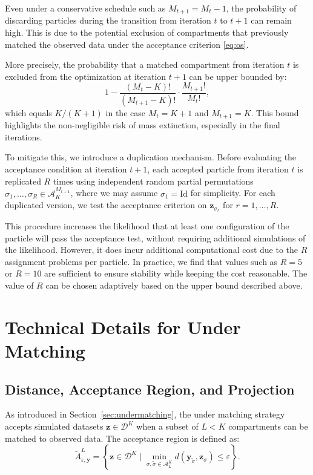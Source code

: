 \documentclass[11pt,a4paper]{article}
\def\dataspace{\mathcal{D}}
\def\obsdata{\mathbf{y}}
\def\simdata{\mathbf{z}}
\theoremstyle{plain}
\theoremstyle{definition}
\theoremstyle{remark}
\begin{document}
Even under a conservative schedule such as \( M_{t+1} = M_t - 1 \), the probability of discarding particles during the transition from iteration \( t \) to \( t+1 \) can remain high. This is due to the potential exclusion of compartments that previously matched the observed data under the acceptance criterion \eqref{eq:os}.

More precisely, the probability that a matched compartment from iteration \( t \) is excluded from the optimization at iteration \( t+1 \) can be upper bounded by:
\[
1 - \frac{(M_t - K)!}{(M_{t+1} - K)!} \cdot \frac{M_{t+1}!}{M_t!},
\]
which equals \( K/(K+1) \) in the case \( M_t = K + 1 \) and \( M_{t+1} = K \). This bound highlights the non-negligible risk of mass extinction, especially in the final iterations.

To mitigate this, we introduce a duplication mechanism. Before evaluating the acceptance condition at iteration \( t+1 \), each accepted particle from iteration \( t \) is replicated \( R \) times using independent random partial permutations \( \sigma_1, \dots, \sigma_R \in \mathcal{A}_K^{M_{t+1}} \), where we may assume \( \sigma_1 = \mathrm{Id} \) for simplicity. For each duplicated version, we test the acceptance criterion on \( \simdata_{\sigma_r} \) for \( r = 1, \dots, R \).

This procedure increases the likelihood that at least one configuration of the particle will pass the acceptance test, without requiring additional simulations of the likelihood. However, it does incur additional computational cost due to the \( R \) assignment problems per particle. In practice, we find that values such as \( R = 5 \) or \( R = 10 \) are sufficient to ensure stability while keeping the cost reasonable. The value of \( R \) can be chosen adaptively based on the upper bound described above.

\section{Technical Details for Under Matching}
\label{appendix_um}

\subsection{Distance, Acceptance Region, and Projection}

As introduced in Section~\ref{sec:undermatching}, the under matching strategy accepts simulated datasets \( \simdata \in \dataspace^K \) when a subset of \( L < K \) compartments can be matched to observed data. The acceptance region is defined as:
\[
\tilde A_{\varepsilon, \obsdata}^{L} = \left\{ \simdata \in \dataspace^K \mid \min_{\sigma, \tilde{\sigma} \in \mathcal A_L^K} d(\obsdata_{\tilde \sigma}, \simdata_\sigma) \leq \varepsilon \right\}.
\]
\end{document}
